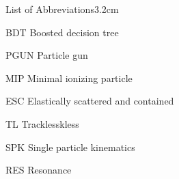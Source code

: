 \begin{mclistof}{List of Abbreviations}{3.2cm}
\item[BDT] Boosted decision tree
\item[PGUN] Particle gun

\item[MIP] Minimal ionizing particle
\item[ESC] Elastically scattered and contained
\item[TL] Tracklesskless

\item[SPK] Single particle kinematics 
\item[RES] Resonance 

\end{mclistof} 
